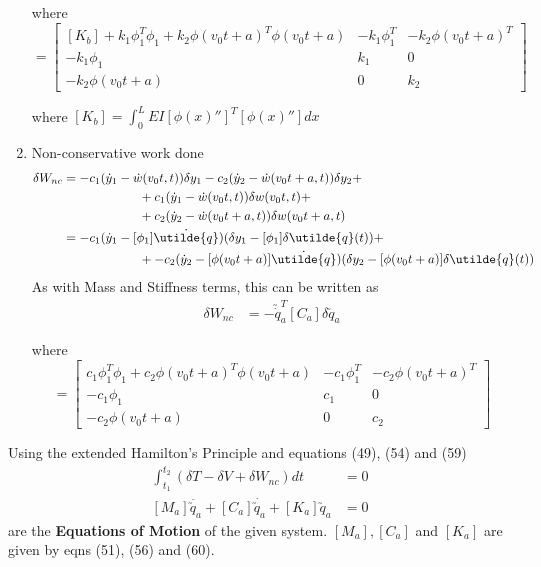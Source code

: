 \documentclass[11pt, oneside]{article}   	%
\begin{document}
\begin{enumerate}
where 
\begin{equation}
[K_a] = \begin{bmatrix}
[K_b]+k_1\phi_1^T\phi_1+k_2\phi(v_0t+a)^T\phi(v_0t+a) & -k_1\phi_1^T & -k_2\phi(v_0t+a)^T \\
-k_1\phi_1 & k_1 & 0 \\
-k_2\phi(v_0t+a) & 0 & k_2
\end{bmatrix}
\end{equation}

where $[K_b] = \int_0^L EI [\phi(x)'']^T [\phi(x)''] dx $

\item Non-conservative work done
\begin{align}
 \delta W_{nc} &= -c_1(\dot{y}_1 - \dot{w}(v_0t,t))\delta y_1 - c_2(\dot{y}_2 - \dot{w}(v_0t+a,t))\delta y_2 + \\ \notag
  & \qquad \qquad \qquad +c_1(\dot{y}_1 - \dot{w}(v_0t,t))\delta w(v_0t,t)+\\ \notag
  & \qquad \qquad \qquad+c_2(\dot{y}_2 - \dot{w}(v_0t+a,t))\delta w(v_0t+a,t) \\ 
  &= -c_1(\dot{y}_1 - [\phi_1] \dot{\utilde{q}})(\delta y_1-[\phi_1]\delta \utilde{q}(t)) + \\ \notag
  & \qquad \qquad \qquad+ -c_2(\dot{y}_2 - [\phi(v_0t+a)] \dot{\utilde{q}})(\delta y_2-[\phi(v_0t+a)]\delta \utilde{q}(t))
\end{align}
As with Mass and Stiffness terms, this can be written as
\begin{align}  
\delta W_{nc} &= -\utilde{\dot{q}}_a^T [C_a] \delta \utilde{q}_a
\end{align}

where 
\begin{equation}
[C_a] = \begin{bmatrix}
c_1\phi_1^T\phi_1+c_2\phi(v_0t+a)^T\phi(v_0t+a) & -c_1\phi_1^T & -c_2\phi(v_0t+a)^T \\
-c_1\phi_1 & c_1 & 0 \\
-c_2\phi(v_0t+a) & 0 & c_2
\end{bmatrix}
\end{equation}
\end{enumerate}

Using the extended Hamilton's Principle and equations (49), (54) and (59)
\begin{align}
 \int_{t_1}^{t_2} (\delta T -\delta V + \delta W_{nc}	)dt &= 0 \\
 [M_a] \ddot{\utilde{q}_a} + [C_a] \dot{\utilde{q}_a} + [K_a]{\utilde{q}_a} &= 0
\end{align}
are the \textbf{Equations of Motion} of the given system. $[M_a], [C_a]$ and $[K_a]$ are given by eqns (51), (56) and (60).
\end{document}
